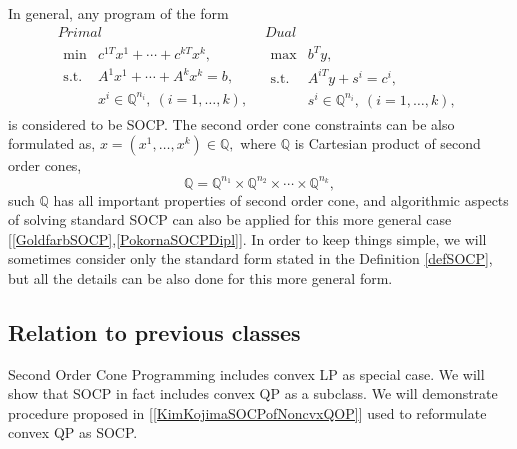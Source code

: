 \documentclass[12pt]{book}
\theoremstyle{definition}
\begin{document}
\rem In general, any program of the form 
\begin{equation}
\begin{array}{cc}
Primal & Dual \\
\begin{array}{ll}
\mbox{min} &  c^{1T}x^1+\cdots + c^{kT}x^k,\\
\mbox{s.t.}& A^1x^1+ \cdots + A^kx^k = b, \\
& x^i \in \mathbb{Q}^{n_i}, \ (i = 1,\dots ,k),
\end{array} 
 & 
 \begin{array}{ll}
\mbox{max} & b^Ty,\\
\mbox{s.t.}& A^{iT}y + s^i = c^i, \\ %
& s^i \in \mathbb{Q}^{n_i}, \ (i = 1,\dots ,k),
\end{array}
\end{array}
\label{genSOCP}
\end{equation}
is considered to be SOCP.
The second order cone constraints can be also formulated as, $x = (x^1,\dots ,x^k) \in \mathbb{Q},$ where $\mathbb{Q}$ is Cartesian product of second order cones, 
\begin{equation}
\mathbb{Q} = \mathbb{Q}^{n_1}\times \mathbb{Q}^{n_2}\times \cdots \times \mathbb{Q}^{n_k},
\end{equation}
 such $\mathbb{Q}$ has all important properties of second order cone, 
and algorithmic aspects of solving standard SOCP can also be applied for this more general case [\ref{GoldfarbSOCP},\ref{PokornaSOCPDipl}].
In order to keep things simple, we will sometimes consider only the standard form stated in the Definition \ref{defSOCP}, but all the details can be also done for this more general form.


\subsection{Relation to previous classes}
\label{SectionRelBtwSOCPandQCQP}

Second Order Cone Programming includes convex LP as special case.
We will show that SOCP in fact includes convex QP as a subclass. We will demonstrate procedure proposed in [\ref{KimKojimaSOCPofNoncvxQOP}] used to reformulate convex QP as SOCP.
\end{document}
